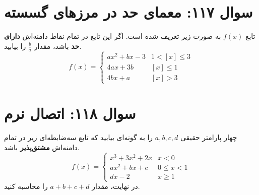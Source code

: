 \documentclass[12pt]{article}
\begin{document}
\vspace{1cm}
\hrulefill
\vspace{1cm}


\section*{سوال ۱۱۷: معمای حد در مرزهای گسسته}
تابع \(f(x)\) به صورت زیر تعریف شده است. اگر این تابع در تمام نقاط دامنه‌اش \textbf{دارای حد} باشد، مقدار \( \frac{b}{a} \) را بیابید.
\begin{displaymath}
	f(x) = 
	\begin{cases}
		ax^2 + bx - 3 &  1 < [x] \le 3 \\
		4ax + 3b      &  [x] \le 1 \\
		4bx + a       &  [x] > 3
	\end{cases}
\end{displaymath}


\vspace{1cm}
\hrulefill
\vspace{1cm}

\section*{سوال ۱۱۸: اتصال نرم}
چهار پارامتر حقیقی \(a, b, c, d\) را به گونه‌ای بیابید که تابع سه‌ضابطه‌ای زیر در تمام دامنه‌اش \textbf{مشتق‌پذیر} باشد.
\begin{displaymath}
	f(x) = 
	\begin{cases}
		x^3 + 3x^2 + 2x & x < 0 \\
		ax^2 + bx + c   &  0 \le x < 1 \\
		dx - 2          &  x \ge 1
	\end{cases}
\end{displaymath}
در نهایت، مقدار \(a+b+c+d\) را محاسبه کنید.



\vspace{1cm}
\hrulefill
\vspace{1cm}

\end{document}
